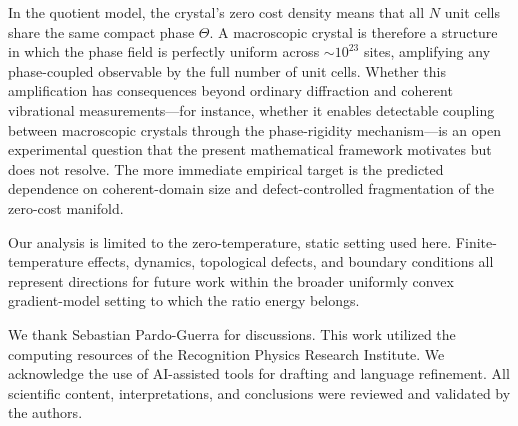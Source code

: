 \documentclass[prb,twocolumn,nofootinbib,superscriptaddress]{revtex4-2}
\begin{document}
In the quotient model, the crystal's zero cost density means that all $N$ unit cells share the same compact phase $\Theta$.
A macroscopic crystal is therefore a structure in which the phase field is perfectly uniform across $\sim 10^{23}$ sites, amplifying any phase-coupled observable by the full number of unit cells.
Whether this amplification has consequences beyond ordinary diffraction and coherent vibrational measurements---for instance, whether it enables detectable coupling between macroscopic crystals through the phase-rigidity mechanism---is an open experimental question that the present mathematical framework motivates but does not resolve.
The more immediate empirical target is the predicted dependence on coherent-domain size and defect-controlled fragmentation of the zero-cost manifold.

Our analysis is limited to the zero-temperature, static setting used here.
Finite-temperature effects, dynamics, topological defects, and boundary conditions all represent directions for future work within the broader uniformly convex gradient-model setting to which the ratio energy belongs.

\begin{acknowledgments}
We thank Sebastian Pardo-Guerra for discussions.
This work utilized the computing resources of the Recognition Physics Research Institute.
We acknowledge the use of AI-assisted tools for drafting and language refinement.
All scientific content, interpretations, and conclusions were reviewed and validated by the authors.
\end{acknowledgments}
\end{document}
